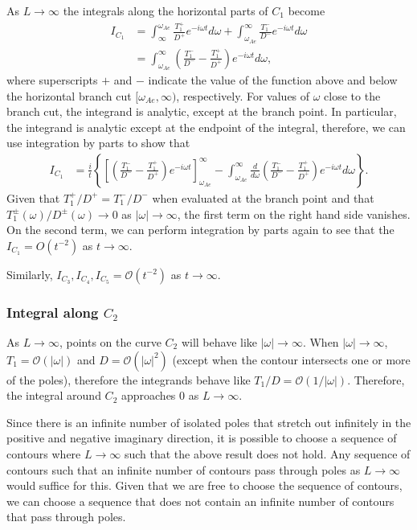 \documentclass[12pt]{../style-files/ociamthesis}
\begin{document}
As $L \to \infty$ the integrals along the horizontal parts of $C_1$ become
\begin{align}
I_{C_1}
&= \int_{\infty}^{\omega_{Ae}} \frac{T_1^+}{D^+} e^{-i\omega t} d\omega + \int_{\omega_{Ae}}^{\infty} \frac{T_1^-}{D^-} e^{-i\omega t} d\omega \\
&= \int_{\omega_{Ae}}^{\infty} \left( \frac{T_1^-}{D^-} - \frac{T_1^+}{D^+} \right) e^{-i\omega t} d\omega,
\end{align}
where superscripts $+$ and $-$ indicate the value of the function above and below the horizontal branch cut $[\omega_{Ae}, \infty)$, respectively. For values of $\omega$ close to the branch cut, the integrand is analytic, except at the branch point. In particular, the integrand is analytic except at the endpoint of the integral, therefore, we can use integration by parts to show that
\begin{align}
I_{C_1} &= \frac{i}{t} \left\{ \left[ \left( \frac{T_1^-}{D^-} - \frac{T_1^+}{D^+} \right) e^{-i\omega t}\right]_{\omega_{Ae}}^{\infty} - \int_{\omega_{Ae}}^{\infty} \frac{d}{d\omega} \left( \frac{T_1^-}{D^-} - \frac{T_1^+}{D^+} \right) e^{-i\omega t} d\omega \right\}.
\end{align}
Given that $T_1^+/D^+ = T_1^-/D^-$ when evaluated at the branch point and that $T_1^\pm(\omega)/D^\pm(\omega) \to 0$ as $|\omega| \to \infty$, the first term on the right hand side vanishes. On the second term, we can perform integration by parts again to see that the $I_{C_1} = O(t^{-2})$ as $t \to \infty$. 

Similarly, $I_{C_3}, I_{C_4}, I_{C_5} = \mathcal{O}(t^{-2})$ as $t \to \infty$.


\subsubsection{Integral along \texorpdfstring{$C_2$}{C2}}
As $L \to \infty$, points on the curve $C_2$ will behave like $|\omega| \to \infty$. When $|\omega| \to \infty$, $T_1 = \mathcal{O}(|\omega|)$ and $D = \mathcal{O}(|\omega|^2)$ (except when the contour intersects one or more of the poles), therefore the integrands behave like $T_1/D = \mathcal{O}(1/|\omega|)$. Therefore, the integral around $C_2$ approaches $0$ as $L \to \infty$.

Since there is an infinite number of isolated poles that stretch out infinitely in the positive and negative imaginary direction, it is possible to choose a sequence of contours where $L \to \infty$ such that the above result does not hold. Any sequence of contours such that an infinite number of contours pass through poles as $L \to \infty$ would suffice for this. Given that we are free to choose the sequence of contours, we can choose a sequence that does not contain an infinite number of contours that pass through poles.
\end{document}
